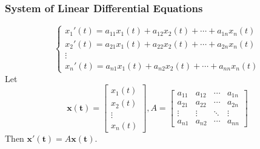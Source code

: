 \documentclass[10pt, a4paper]{article}
\newcommand{\vt}[1]{\mathbf{#1}}
\begin{document}
\subsubsection{System of Linear Differential Equations}
\begin{equation*}
    \begin{cases}
        x_1'(t) = a_{11} x_1(t) + a_{12} x_2(t) + \cdots + a_{1n} x_n(t)\\
        x_2'(t) = a_{21} x_1(t) + a_{22} x_2(t) + \cdots + a_{2n} x_n(t)\\
        \vdots\\
        x_n'(t) = a_{n1} x_1(t) + a_{n2} x_2(t) + \cdots + a_{nn} x_n(t)
    \end{cases}
\end{equation*}
Let \[
\vt{x(t)}=\begin{bmatrix}
    x_1(t)\\
    x_2(t)\\
    \vdots\\
    x_n(t)
\end{bmatrix}
, A=\begin{bmatrix}
    a_{11}&a_{12}&\cdots&a_{1n}\\
    a_{21}&a_{22}&\cdots&a_{2n}\\
    \vdots&\vdots&\ddots&\vdots\\
    a_{n1}&a_{n2}&\cdots&a_{nn}
\end{bmatrix}
\]
Then $\vt{x'(t)}=A\vt{x(t)}$.\\
\end{document}
